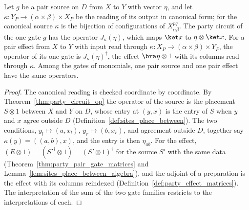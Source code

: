 \begin{theorem}
    \label{thm:party_pair_gate_op}
    \leanok
    Let $g$ be a pair source on $D$ from $X$ to $Y$ with vector $\eta$, and let
    $\kappa\colon Y_P\to(\alpha\times\beta)\times X_P$ be the reading of its output in
    canonical form; for the canonical source $\kappa$ is the bijection of
    configurations of $X^{pq}_{\alpha\beta}$. The party circuit of the one gate $g$ has
    the operator $J_\kappa(\eta)$, which maps $\ket x$ to $\eta\otimes\ket x$.
    For a pair effect from $X$ to $Y$ with input read through
    $\kappa\colon X_P\to(\alpha\times\beta)\times Y_P$, the operator of its one gate is
    $J_\kappa(\eta)^\dagger$, the effect $\bra\eta\otimes1$ with its columns read
    through $\kappa$. Among the gates of monomials, one pair source and one pair effect
    have the same operators.
\end{theorem}
\begin{proof}\leanok
    The canonical reading is checked coordinate by coordinate. By
    Theorem~\ref{thm:party_circuit_op} the operator of the source is the placement
    $S\otimes1$ between $X$ and $Y$ on $D$, whose entry at $(y,x)$ is the entry of $S$
    when $y$ and $x$ agree outside $D$ (Definition~\ref{def:sites_place_between}). The
    two conditions, $y_l\mapsto(a,x_l)$, $y_r\mapsto(b,x_r)$, and agreement outside
    $D$, together say $\kappa(y)=((a,b),x)$, and the entry is then $\eta_{ab}$. For the
    effect, $(E\otimes1)=(S'^\dagger\otimes1)=(S'\otimes1)^\dagger$ for the source $S'$
    with the same data (Theorem~\ref{thm:party_pair_gate_matrices} and
    Lemma~\ref{lem:sites_place_between_algebra}), and the adjoint of a preparation is
    the effect with its columns reindexed (Definition~\ref{def:party_effect_matrices}).
    The interpretation of the sum of the two gate families restricts to the
    interpretations of each.
\end{proof}

